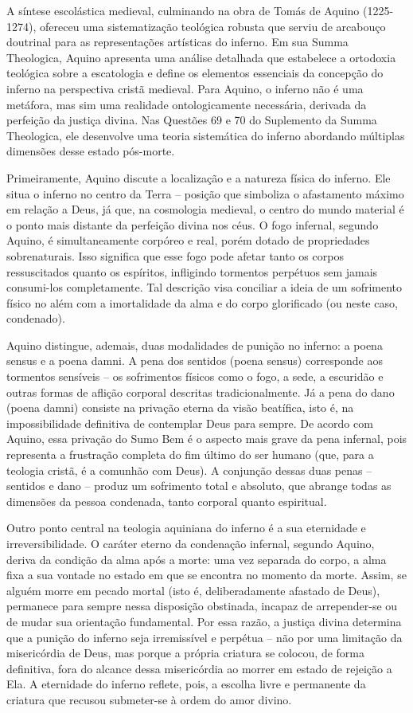 A síntese escolástica medieval, culminando na obra de Tomás de Aquino (1225-1274), ofereceu uma sistematização teológica robusta que serviu de arcabouço doutrinal para as representações artísticas do inferno. Em sua Summa Theologica, Aquino apresenta uma análise detalhada que estabelece a ortodoxia teológica sobre a escatologia e define os elementos essenciais da concepção do inferno na perspectiva cristã medieval. Para Aquino, o inferno não é uma metáfora, mas sim uma realidade ontologicamente necessária, derivada da perfeição da justiça divina. Nas Questões 69 e 70 do Suplemento da Summa Theologica, ele desenvolve uma teoria sistemática do inferno abordando múltiplas dimensões desse estado pós-morte.

Primeiramente, Aquino discute a localização e a natureza física do inferno. Ele situa o inferno no centro da Terra -- posição que simboliza o afastamento máximo em relação a Deus, já que, na cosmologia medieval, o centro do mundo material é o ponto mais distante da perfeição divina nos céus. O fogo infernal, segundo Aquino, é simultaneamente corpóreo e real, porém dotado de propriedades sobrenaturais. Isso significa que esse fogo pode afetar tanto os corpos ressuscitados quanto os espíritos, infligindo tormentos perpétuos sem jamais consumi-los completamente. Tal descrição visa conciliar a ideia de um sofrimento físico no além com a imortalidade da alma e do corpo glorificado (ou neste caso, condenado).

Aquino distingue, ademais, duas modalidades de punição no inferno: a poena sensus e a poena damni. A pena dos sentidos (poena sensus) corresponde aos tormentos sensíveis -- os sofrimentos físicos como o fogo, a sede, a escuridão e outras formas de aflição corporal descritas tradicionalmente. Já a pena do dano (poena damni) consiste na privação eterna da visão beatífica, isto é, na impossibilidade definitiva de contemplar Deus para sempre. De acordo com Aquino, essa privação do Sumo Bem é o aspecto mais grave da pena infernal, pois representa a frustração completa do fim último do ser humano (que, para a teologia cristã, é a comunhão com Deus). A conjunção dessas duas penas -- sentidos e dano -- produz um sofrimento total e absoluto, que abrange todas as dimensões da pessoa condenada, tanto corporal quanto espiritual.

Outro ponto central na teologia aquiniana do inferno é a sua eternidade e irreversibilidade. O caráter eterno da condenação infernal, segundo Aquino, deriva da condição da alma após a morte: uma vez separada do corpo, a alma fixa a sua vontade no estado em que se encontra no momento da morte. Assim, se alguém morre em pecado mortal (isto é, deliberadamente afastado de Deus), permanece para sempre nessa disposição obstinada, incapaz de arrepender-se ou de mudar sua orientação fundamental. Por essa razão, a justiça divina determina que a punição do inferno seja irremissível e perpétua -- não por uma limitação da misericórdia de Deus, mas porque a própria criatura se colocou, de forma definitiva, fora do alcance dessa misericórdia ao morrer em estado de rejeição a Ela. A eternidade do inferno reflete, pois, a escolha livre e permanente da criatura que recusou submeter-se à ordem do amor divino.

